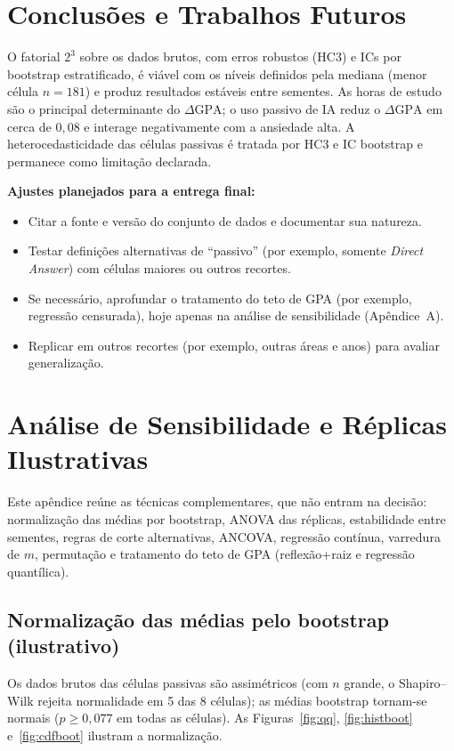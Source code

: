 \documentclass[12pt,a4paper]{article}
\newcommand{\dgpa}{\ensuremath{\Delta\mathrm{GPA}}}
\begin{document}
\section{Conclus\~oes e Trabalhos Futuros}
O fatorial $2^3$ sobre os dados brutos, com erros robustos (HC3) e ICs por bootstrap estratificado, \'e vi\'avel com os n\'iveis definidos pela mediana (menor c\'elula $n=181$) e produz resultados est\'aveis entre sementes. As horas de estudo s\~ao o principal determinante do \dgpa{};
o uso passivo de IA reduz o \dgpa{} em cerca de $0{,}08$ e interage negativamente com a ansiedade alta. A heterocedasticidade das c\'elulas passivas \'e tratada por HC3 e IC bootstrap e permanece como limita\c{c}\~ao declarada.

\textbf{Ajustes planejados para a entrega final:}
\begin{itemize}
\item Citar a fonte e vers\~ao do conjunto de dados e documentar sua natureza.
\item Testar defini\c{c}\~oes alternativas de ``passivo'' (por exemplo, somente \emph{Direct Answer}) com c\'elulas maiores ou outros recortes.
\item Se necess\'ario, aprofundar o tratamento do teto de GPA (por exemplo, regress\~ao censurada), hoje apenas na an\'alise de sensibilidade (Ap\^endice~A).
\item Replicar em outros recortes (por exemplo, outras \'areas e anos) para avaliar generaliza\c{c}\~ao.
\end{itemize}

\appendix
\section{An\'alise de Sensibilidade e R\'eplicas Ilustrativas}
Este ap\^endice re\'une as t\'ecnicas complementares, que n\~ao entram na decis\~ao: normaliza\c{c}\~ao das m\'edias por bootstrap, ANOVA das r\'eplicas, estabilidade entre sementes, regras de corte alternativas, ANCOVA, regress\~ao cont\'inua, varredura de $m$, permuta\c{c}\~ao e tratamento do teto de GPA (reflex\~ao+raiz e regress\~ao quant\'ilica).

\subsection{Normaliza\c{c}\~ao das m\'edias pelo bootstrap (ilustrativo)}
Os dados brutos das c\'elulas passivas s\~ao assim\'etricos (com $n$ grande, o Shapiro--Wilk rejeita normalidade em 5 das 8 c\'elulas); as m\'edias bootstrap tornam-se normais
($p\ge0{,}077$ em todas as c\'elulas). As Figuras~\ref{fig:qq}, \ref{fig:histboot} e~\ref{fig:cdfboot} ilustram a normaliza\c{c}\~ao.
\end{document}
